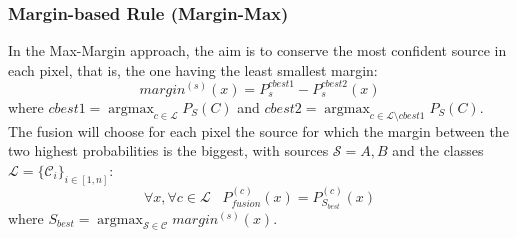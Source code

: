 \documentclass[10pt]{article}
\DeclareMathOperator{\argmax}{argmax}
\begin{document}
\subsubsection{Margin-based Rule (Margin-Max)}\label{sec:margin}
In the Max-Margin approach, the aim is to conserve the most confident source in each pixel, that is, the one having the least smallest margin:
\begin{equation}
    margin^{(s)}(x)=P_s^{cbest1}-P_s^{cbest2}(x)
\end{equation}
where $cbest1=\argmax_{c\in\mathcal{L}}P_S(C)$ and $cbest2=\argmax_{c\in\mathcal{L}\setminus cbest1}P_S(C)$. The fusion will choose for each pixel the source for which the margin between the two highest probabilities is the biggest, with sources $\mathcal{S}={A,B}$ and the classes $\mathcal{L}=\{\mathcal{C}_i\}_{i\in[1,n]}$:
\begin{equation}
    \forall x,\forall c\in \mathcal{L}\;\;\; P_{fusion}^{(c)}(x)=P_{S_{best}}^{(c)}(x)
\end{equation}
where $S_{best}=\argmax_{\mathcal{S}\in\mathcal{C}}margin^{(s)}(x)$.
\end{document}
